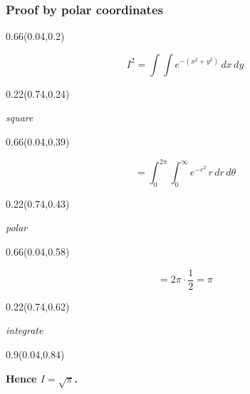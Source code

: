 \documentclass[aspectratio=169]{beamer}
\begin{document}
\begin{frame}[t]
  \frametitle{Proof by polar coordinates}

\begin{textblock}{0.66}(0.04,0.2)
{\centering\fontsize{22}{26}\selectfont \[I^2 = \int\int e^{-(x^2+y^2)}\,dx\,dy\]\par}
\end{textblock}

\begin{textblock}{0.22}(0.74,0.24)
{\raggedright\fontsize{15}{18}\selectfont \textcolor[HTML]{666666}{\textit{square}}\par}
\end{textblock}

\begin{textblock}{0.66}(0.04,0.39)
{\centering\fontsize{22}{26}\selectfont \[= \int_0^{2\pi}\int_0^{\infty} e^{-r^2}\,r\,dr\,d\theta\]\par}
\end{textblock}

\begin{textblock}{0.22}(0.74,0.43)
{\raggedright\fontsize{15}{18}\selectfont \textcolor[HTML]{666666}{\textit{polar}}\par}
\end{textblock}

\begin{textblock}{0.66}(0.04,0.58)
{\centering\fontsize{22}{26}\selectfont \[= 2\pi \cdot \frac{1}{2} = \pi\]\par}
\end{textblock}

\begin{textblock}{0.22}(0.74,0.62)
{\raggedright\fontsize{15}{18}\selectfont \textcolor[HTML]{666666}{\textit{integrate}}\par}
\end{textblock}

\begin{textblock}{0.9}(0.04,0.84)
{\centering\fontsize{18}{22}\selectfont \textcolor[HTML]{002147}{\textbf{Hence $I = \sqrt{\pi}$.}}\par}
\end{textblock}
\end{frame}
\end{document}
